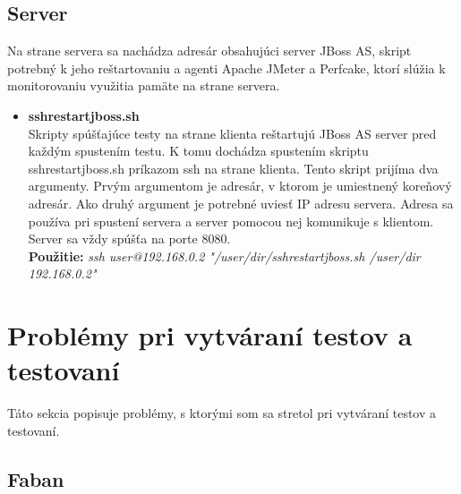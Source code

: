 \documentclass[12pt,oneside,final]{fithesis-utf8}
\newcommand\underscore[1]{\underline{\hspace{8pt}}}
\begin{document}
\newpage
\subsection{Server}
Na strane servera sa nachádza adresár obsahujúci server JBoss AS, skript potrebný k jeho reštartovaniu a agenti Apache JMeter a Perfcake, ktorí slúžia k monitorovaniu využitia pamäte na strane servera.

\begin{itemize}

\item \textbf{ssh\underscore{}restart\underscore{}jboss.sh}\\
Skripty spúšťajúce testy na strane klienta reštartujú JBoss AS server pred každým spustením testu. K tomu dochádza spustením skriptu ssh\underscore{}restart\underscore{}jboss.sh príkazom ssh na strane klienta. Tento skript prijíma dva argumenty. Prvým argumentom je adresár, v ktorom je umiestnený koreňový adresár. Ako druhý argument je potrebné uviesť IP adresu servera. Adresa sa používa pri spustení servera a server pomocou nej komunikuje s klientom. Server sa vždy spúšťa na porte 8080.\\
\textbf{Použitie:} \textit{ssh user@192.168.0.2 "/user/dir/ssh\underscore{}restart\underscore{}jboss.sh /user/dir 192.168.0.2"}
\end{itemize}

\section{Problémy pri vytváraní testov a testovaní}
Táto sekcia popisuje problémy, s ktorými som sa stretol pri vytváraní testov a testovaní.

\subsection{Faban}
\end{document}
